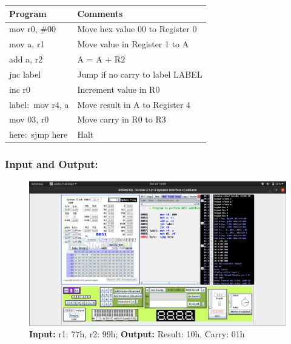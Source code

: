 \documentclass[12pt,a4paper]{article}
\begin{document}
\begin{flushleft}
\begin{table}[htb]
\centering
\begin{tabular}{|l|l|} 
\hline
\textbf{Program}                                                 & \textbf{Comments}                             \\ 
\hline
\hline
mov r0, \#00                                                      & Move hex value 00 to Register 0               \\
\hline
mov a, r1                                                        & Move value in Register 1 to A                 \\
\hline
add a, r2                                                        & A = A + R2                                    \\
\hline
jnc label                                                        & Jump if no carry to label LABEL               \\
\hline
inc r0                                                           & Increment value in R0                         \\
\hline
label:~mov r4, a                                                 & Move result in A to Register 4                \\
\hline
mov 03, r0                                                       & Move carry in R0 to R3                        \\
\hline
here:~sjmp here                                                  & Halt                                          \\
\hline
\end{tabular}
\end{table}

\subsubsection*{\textbf{Input and Output:}}
\begin{figure}[h]
    \centering
    \includegraphics[trim = 60mm 75mm 60mm 10mm, clip, width = \textwidth]{Pics/Add.png}
    \caption{ \textbf{Input:} r1: 77h, r2: 99h; 
              \textbf{Output:} Result: 10h, Carry: 01h}
\end{figure}
\newpage

\end{flushleft}
\end{document}
